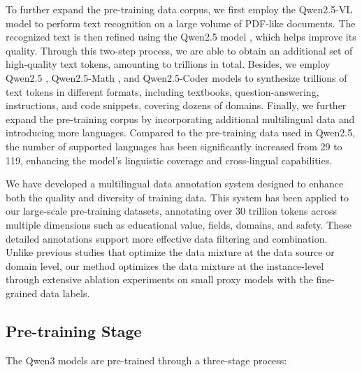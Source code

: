 \documentclass[dvipsnames]{article}
\begin{document}
To further expand the pre-training data corpus, we first employ the Qwen2.5-VL model \citep{qwen2.5vl} to perform text recognition on a large volume of PDF-like documents. The recognized text is then refined using the Qwen2.5 model \citep{qwen2.5}, which helps improve its quality. Through this two-step process, we are able to obtain an additional set of high-quality text tokens, amounting to trillions in total. 
Besides, we employ Qwen2.5 \citep{qwen2.5}, Qwen2.5-Math \citep{qwen2.5math}, and Qwen2.5-Coder \citep{qwen2.5coder} models to synthesize trillions of text tokens in different formats, including textbooks, question-answering, instructions, and code snippets, covering dozens of domains. 
Finally, we further expand the pre-training corpus by incorporating additional multilingual data and introducing more languages. Compared to the pre-training data used in Qwen2.5, the number of supported languages has been significantly increased from 29 to 119, enhancing the model's linguistic coverage and cross-lingual capabilities.

We have developed a multilingual data annotation system designed to enhance both the quality and diversity of training data.
This system has been applied to our large-scale pre-training datasets, annotating over 30 trillion tokens across multiple dimensions such as educational value, fields, domains, and safety. These detailed annotations support more effective data filtering and combination. 
Unlike previous studies \citep{doremi,doge,regmix} that optimize the data mixture at the data source or domain level, our method optimizes the data mixture at the instance-level through extensive ablation experiments on small proxy models with the fine-grained data labels.

\subsection{Pre-training Stage}
The Qwen3 models are pre-trained through a three-stage process:
\end{document}
